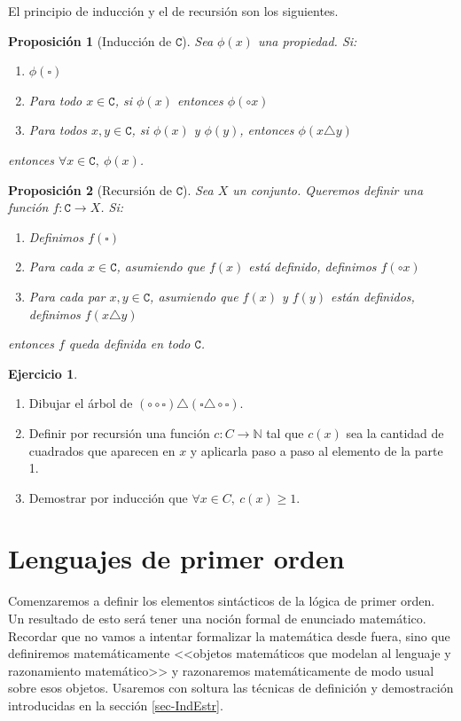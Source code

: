 \documentclass[a4paper, 12pt]{report}
\newcommand{\N}{\mathbb{N}}
\newtheorem*{prop*}{Proposición}
\theoremstyle{definition}
\newtheorem{ejercicio}{Ejercicio}[section]
\begin{document}
El principio de inducción y el de recursión son los siguientes.
\begin{prop*}[Inducción de $\mathtt{C}$]
	
	Sea $\phi(x)$ una propiedad. Si:
	\begin{enumerate}
		\item $\phi(\square)$
		\item Para todo $x\in\mathtt{C}$, si $\phi(x)$ entonces $\phi(\circ x)$
		\item Para todos $x,y\in\mathtt{C}$, si $\phi(x)$ y $\phi(y)$, entonces $\phi(x\triangle y)$	\end{enumerate}
	entonces $\forall x\in\mathtt{C},~\phi(x)$.
\end{prop*}
\begin{prop*}[Recursión de $\mathtt{C}$]
	Sea $X$ un conjunto. Queremos definir una función \linebreak$f:\mathtt{C}\to X$. Si:
	\begin{enumerate}
		\item Definimos $f(\square)$
		\item Para cada $x\in\mathtt{C}$, asumiendo que $f(x)$ está definido, definimos $f(\circ x)$
		\item Para cada par $x,y\in\mathtt{C}$, asumiendo que $f(x)$ y $f(y)$ están definidos, definimos $f(x\triangle y)$
	\end{enumerate}
	entonces $f$ queda definida en todo $\mathtt{C}$.
\end{prop*}

\begin{ejercicio}
	\begin{enumerate}
		\item Dibujar el árbol de $(\circ\circ\square)\triangle(\square\triangle\circ\square)$.
		\item Definir por recursión una función $c:C\to\N$ tal que $c(x)$ sea la cantidad de cuadrados que aparecen en $x$ y aplicarla paso a paso al elemento de la parte 1.
		\item Demostrar por inducción que $\forall x\in C,~c(x)\geq 1$.
	\end{enumerate}
\end{ejercicio}

\section{Lenguajes de primer orden}\label{sec-LPO}

Comenzaremos a definir los elementos sintácticos de la lógica de primer orden. Un resultado de esto será tener una noción formal de enunciado matemático. Recordar que no vamos a intentar formalizar la matemática desde fuera, sino que definiremos matemáticamente <<objetos matemáticos que modelan al lenguaje y razonamiento matemático>> y razonaremos matemáticamente de modo usual sobre esos objetos. Usaremos con soltura las técnicas de definición y demostración introducidas en la sección \ref{sec-IndEstr}.
\end{document}
